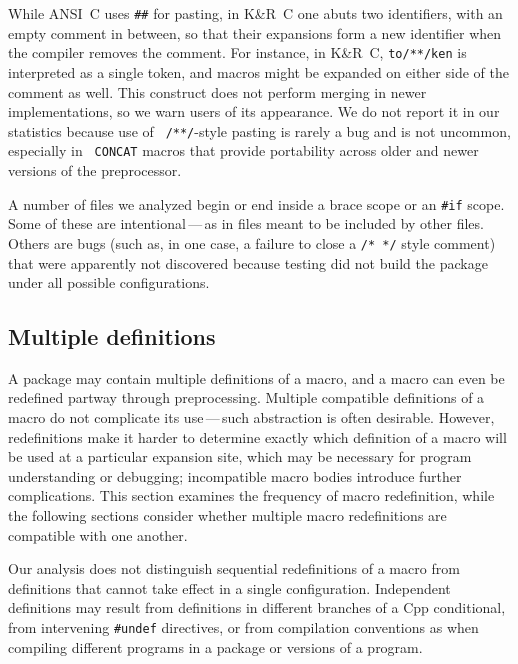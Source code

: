 \documentclass[10pt]{article}
\begin{document}
While ANSI~C uses {\tt \#\#} for pasting, in K\&R~C one abuts two identifiers,
with an empty comment in between, so that their expansions form a new
identifier when the compiler removes the comment.  For instance, in K\&R~C,
{\tt to/**/ken} is interpreted as a single token, and macros might be
expanded on either side of the comment as well.  This construct does not
perform merging in newer implementations, so we warn users of its
appearance.  We do not report it in our statistics because use of {\tt
/**/}-style pasting is rarely a bug and is not uncommon, especially in {\tt
CONCAT} macros that provide portability across older and newer versions of
the preprocessor.

A number of files we analyzed begin or end inside a brace scope or an
{\tt \#if} scope.  Some of these are intentional\,---\,as in files meant to
be included by other files.  Others are bugs (such as, in one case, a
failure to close a {\tt /* */} style comment) that were apparently not
discovered because testing did not build the package under all possible
configurations.



\subsection{Multiple definitions}
\label{sec:mult-def}

A package may contain multiple definitions of a macro, and a macro can even
be redefined partway through preprocessing.  Multiple compatible
definitions of a macro do not complicate its use\,---\,such abstraction is
often desirable.  However, redefinitions make it harder to determine
exactly which definition of a macro will be used at a particular expansion
site, which may be necessary for program understanding or debugging;
incompatible macro bodies introduce further complications.  This section
examines the frequency of macro redefinition, while the following sections
consider whether multiple macro redefinitions are compatible with one
another.

Our analysis does not distinguish sequential redefinitions of a macro from
definitions that cannot take effect in a single configuration.
Independent definitions may result from definitions in different branches
of a Cpp conditional, from intervening {\tt \#undef} directives, or from
compilation conventions as when compiling different programs in a package
or versions of a program.
\end{document}
